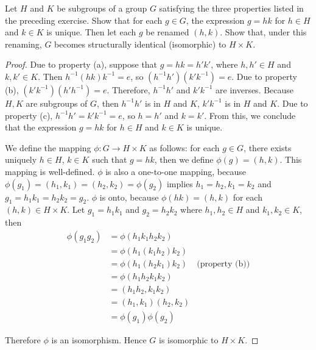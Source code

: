 \newpage
\begin{exercise}
    Let $H$ and $K$ be subgroups of a group $G$ satisfying the three properties listed in the preceding exercise. Show that for each $g\in G$, the expression $g = hk$ for $h\in H$ and $k\in K$ is unique. Then let each $g$ be renamed $(h, k)$. Show that, under this renaming, $G$ becomes structurally identical (isomorphic) to $H\times K$.
\end{exercise}

\begin{proof}
    Due to property (a), suppose that $g = hk = h'k'$, where $h, h'\in H$ and $k, k'\in K$. Then $h^{-1}(hk)k^{-1} = e$, so $(h^{-1}h')(k'k^{-1}) = e$. Due to property (b), $(k'k^{-1})(h'h^{-1}) = e$. Therefore, $h^{-1}h'$ and $k'k^{-1}$ are inverses. Because $H, K$ are subgroups of $G$, then $h^{-1}h'$ is in $H$ and $K$, $k'k^{-1}$ is in $H$ and $K$. Due to property (c), $h^{-1}h' = k'k^{-1} = e$, so $h = h'$ and $k = k'$. From this, we conclude that the expression $g = hk$ for $h\in H$ and $k\in K$ is unique.

    We define the mapping $\phi: G\to H\times K$ as follows: for each $g\in G$, there exists uniquely $h\in H$, $k\in K$ such that $g = hk$, then we define $\phi(g) = (h, k)$. This mapping is well-defined. $\phi$ is also a one-to-one mapping, because $\phi(g_{1}) = (h_{1},k_{1}) = (h_{2},k_{2}) = \phi(g_{2})$ implies $h_{1} = h_{2}, k_{1} = k_{2}$ and $g_{1} = h_{1}k_{1} = h_{2}k_{2} = g_{2}$. $\phi$ is onto, because $\phi(hk) = (h,k)$ for each $(h,k)\in H\times K$. Let $g_{1} = h_{1}k_{1}$ and $g_{2} = h_{2}k_{2}$ where $h_{1}, h_{2}\in H$ and $k_{1}, k_{2}\in K$, then
    \begin{align*}
        \phi(g_{1}g_{2}) & = \phi(h_{1}k_{1}h_{2}k_{2})                           \\
                         & = \phi(h_{1}(k_{1}h_{2})k_{2})                         \\
                         & = \phi(h_{1}(h_{2}k_{1})k_{2}) & \text{(property (b))} \\
                         & = \phi(h_{1}h_{2} k_{1}k_{2})                          \\
                         & = (h_{1}h_{2}, k_{1}k_{2})                             \\
                         & = (h_{1}, k_{1})(h_{2}, k_{2})                         \\
                         & = \phi(g_{1})\phi(g_{2})
    \end{align*}

    Therefore $\phi$ is an isomorphism. Hence $G$ is isomorphic to $H\times K$.
\end{proof}

